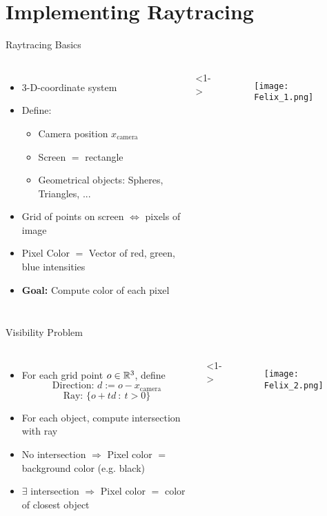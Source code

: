 \section{Implementing Raytracing}
\begin{frame}{Raytracing Basics}
\begin{columns}
    \begin{itemize}
   \item<1-> 3-D-coordinate system
   \item<2-> Define:
   \begin{itemize}
       \item Camera position $x_{\text{camera}}$
       \item Screen $=$ rectangle
       \item Geometrical objects: Spheres, Triangles, ...
   \end{itemize}
   \item<3-> Grid of points on screen $\Leftrightarrow$ pixels of image
   \item<4-> Pixel Color $=$ Vector of red, green, blue intensities
   \item<5-> \textbf{Goal:} Compute color of each pixel
   \end{itemize}
   <1->
   \begin{figure}
                \centering
                \texttt{[image: Felix\_1.png]}
            \end{figure}
\end{columns}
\end{frame}

\begin{frame}{Visibility Problem}
    \begin{columns}
        \begin{itemize}
            \item<1-> For each grid point $o\in\mathbb{R}^3$, define 
            $$
            \text{Direction: }d := o - x_{\text{camera}}
            $$
            $$
            \text{Ray: } \{o + t d \ : \ t > 0\}
            $$
            \item<2-> For each object, compute intersection with ray
            \item<3-> No intersection $\Rightarrow$ Pixel color $=$ background color (e.g. black)
            \item<4-> $\exists$ intersection $\Rightarrow$ Pixel color $=$ color of closest object
        \end{itemize}
        <1->
        \begin{figure}
                \centering
                \texttt{[image: Felix\_2.png]}
            \end{figure}
    \end{columns}
\end{frame}

